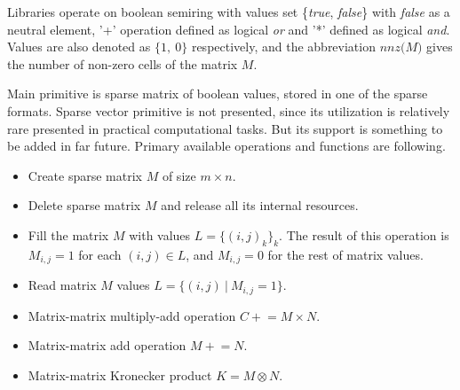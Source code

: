 Libraries operate on boolean semiring with values set \{\textit{true}, \textit{false}\} with \textit{false} as 
a neutral element, '+' operation defined as logical \textit{or} and '*' defined as logical \textit{and}. Values are also denoted as $\{1,~0\}$ respectively, and the abbreviation $\textit{nnz(M)}$ gives the number of non-zero cells of the matrix $M$.

Main primitive is sparse matrix of boolean values, stored in one of the sparse formats. Sparse vector 
primitive is not presented, since its utilization is relatively rare presented in practical computational 
tasks. But its support is something to be added in far future. Primary available operations and functions are following.

\begin{itemize}
    \item Create sparse matrix $M$ of size $m \times n$.
    \item Delete sparse matrix $M$ and release all its internal resources.
    \item Fill the matrix $M$ with values $L = \{(i,j)_k\}_k$. The result of this operation is $M_{i,j} = 1$ for each $(i, j) \in L$, and $M_{i,j} = 0$ for the rest of matrix values.
    \item Read matrix $M$ values $L = \{(i, j)~|~M_{i,j} = 1\}$.
    \item Matrix-matrix multiply-add operation $C \mathrel{+}= M \times N$.
    \item Matrix-matrix add operation $M \mathrel{+}= N$.
    \item Matrix-matrix Kronecker product $K = M \otimes N$.
\end{itemize}